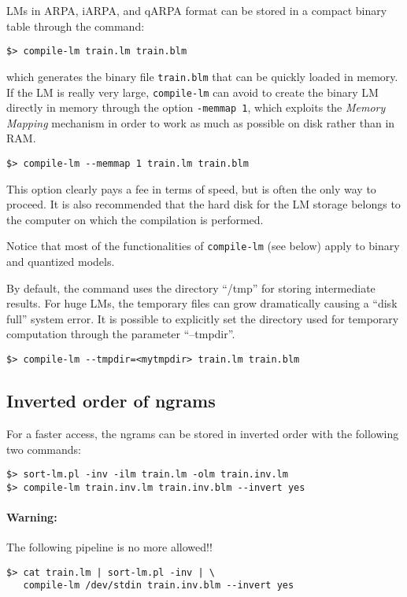 LMs in ARPA, iARPA, and qARPA format can be stored in a compact binary table through the command:

\begin{verbatim}
$> compile-lm train.lm train.blm
\end{verbatim}

\noindent
which generates the binary file {\tt train.blm} that can be quickly loaded in memory.  If the LM
is really very large, {\tt compile-lm} can avoid to create the binary LM directly in memory through the 
option {\tt -memmap 1}, which exploits the {\em Memory Mapping} mechanism in order to work as 
much as possible on disk rather than in RAM. \\

\begin{verbatim}
$> compile-lm --memmap 1 train.lm train.blm
\end{verbatim}
\noindent
This option clearly pays a fee  in terms of speed, but  is often the only way to proceed. It is also recommended 
that the hard disk for the LM storage belongs to the computer on which the compilation is performed.

\noindent
Notice that most of the functionalities of {\tt compile-lm} (see below) apply to binary and quantized models. 

\noindent
By default, the command uses the directory ``/tmp'' for storing
intermediate results.  For huge LMs, the temporary files can grow
dramatically causing a ``disk full'' system error.  It is possible to
explicitly set the directory used for temporary computation through the
parameter ``--tmpdir''.
\begin{verbatim}
$> compile-lm --tmpdir=<mytmpdir> train.lm train.blm
\end{verbatim}


\subsection{Inverted order of ngrams}
\label{sec:inverted-lm}
For a faster access, the ngrams can be stored in inverted order with the following two commands:
\begin{verbatim}
$> sort-lm.pl -inv -ilm train.lm -olm train.inv.lm
$> compile-lm train.inv.lm train.inv.blm --invert yes
\end{verbatim}

\paragraph{Warning:} The following pipeline is no more allowed!!

\begin{verbatim}
$> cat train.lm | sort-lm.pl -inv | \
   compile-lm /dev/stdin train.inv.blm --invert yes
\end{verbatim}




